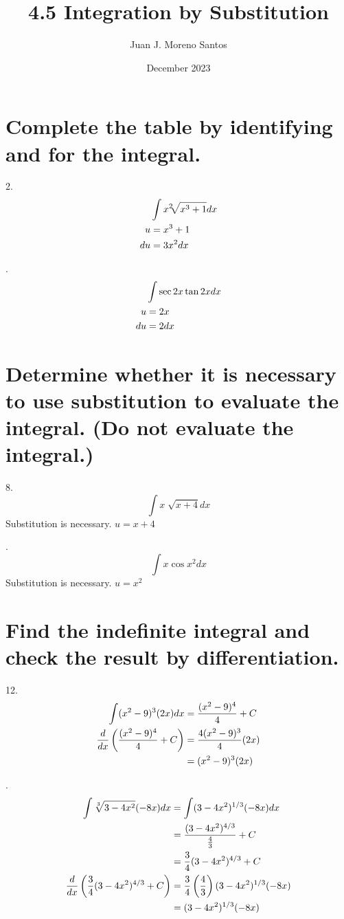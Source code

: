 \documentclass[11pt]{article}
\newcommand*{\vs}{\vspace{1cm}}
\newcommand*{\next}{\noindent}
\newcommand*{\set}{\setcounter{equation}{0}}
\newcommand*{\lt}{\left}
\newcommand*{\rt}{\right}
\begin{document}
\title{4.5 Integration by Substitution}
\author{Juan J. Moreno Santos}
\date{December 2023}

\maketitle

\section{Complete the table by identifying and for
the integral.}
2.\begin{align}
    \set
    &\int x^2\sqrt[]{x^3+1}dx\\
    u&=x^3+1\\
    du&=3x^2dx
\end{align}

\vs\next
4.\begin{align}
    \set
    &\int\sec 2x\tan 2xdx\\
    u&=2x\\
    du&=2dx
\end{align}

\section{Determine whether it is necessary to use substitution to evaluate the integral. (Do not evaluate the integral.)}
8.\[\int x\sqrt[]{x+4}dx\]
Substitution is necessary. $u=x+4$

\vs\next
10.\[\int x\cos x^2dx\]
Substitution is necessary. $u=x^2$

\section{Find the indefinite integral and check the
result by differentiation.}
12.\begin{align}
    \set
    \int(x^2-9)^3(2x)dx&=\frac{(x^2-9)^4}{4}+C\\
    \frac{d}{dx}\lt(\frac{(x^2-9)^4}{4}+C\rt)&=\frac{4(x^2-9)^3}{4}(2x)\\
    &=(x^2-9)^3(2x)
\end{align}

\vs\next
14.\begin{align}
    \set
    \int\sqrt[3]{3-4x^2}(-8x)dx&=\int(3-4x^2)^{1/3}(-8x)dx\\
    &=\frac{(3-4x^2)^{4/3}}{\frac{4}{3}}+C\\
    &=\frac{3}{4}(3-4x^2)^{4/3}+C\\
    \frac{d}{dx}\lt(\frac{3}{4}(3-4x^2)^{4/3}+C\rt)&=\frac{3}{4}\lt(\frac{4}{3}\rt)(3-4x^2)^{1/3}(-8x)\\
    &=(3-4x^2)^{1/3}(-8x)
\end{align}
\end{document}
